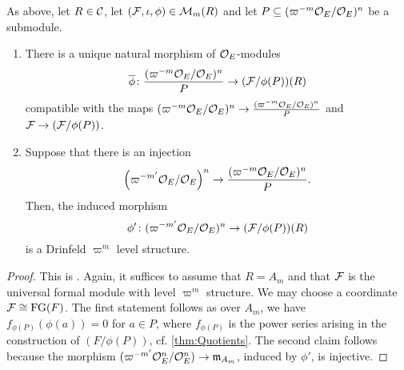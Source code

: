 \documentclass[../main.tex]{subfiles}
\begin{document}
\begin{lem}\label{lem:DrinfeldLevelOnQuotients}
  As above, let $R \in \mathcal{C}$, let $(\mathcal{F}, \iota, \phi) \in \mathcal{M}_m(R)$ and let 
  $P \subseteq (\varpi^{-m}\mathcal{O}_E/\mathcal{O}_E)^n$ be a submodule.   
  \begin{enumerate}
    \item There is a unique natural morphism of $\mathcal{O}_E$-modules
      \begin{equation*}
        \overline \phi \colon \frac{(\varpi^{-m} \mathcal{O}_E/\mathcal{O}_E)^n}{P} \to (\mathcal{F}/\phi(P))(R)
      \end{equation*}
      compatible with the maps $(\varpi^{-m}\mathcal{O}_E/\mathcal{O}_E)^n \to
      \frac{(\varpi^{-m} \mathcal{O}_E/\mathcal{O}_E)^n}{P}$ and $\mathcal{F} \to (\mathcal{F}/\phi(P))$. 
    \item Suppose that  there is an injection 
  \begin{equation*}
    \left(\varpi^{-m'} \mathcal{O}_E/\mathcal{O}_E \right)^n \to \frac{(\varpi^{-m}
    \mathcal{O}_E/\mathcal{O}_E)^n}{P}.
  \end{equation*}
  Then, the induced morphism 
  \begin{equation*}
  \phi'\colon ({\varpi^{-m'} \mathcal{O}_E}/{\mathcal{O}_E})^n  \to 
  (\mathcal{F}/\phi(P))(R)
  \end{equation*}
  is a Drinfeld $\varpi^m$ level structure.
  \end{enumerate}
\end{lem}
\begin{proof}
  This is \cite[Proposition 4.4]{drinfel1974elliptic}. Again, it suffices to assume that $R = A_m$ and that $\mathcal{F}$ is the universal formal module with level
  $\varpi^m$ structure. We may choose a coordinate $\mathcal{F} \cong \textnormal{FG}(F)$. The first
  statement follows as over $A_m$, we have $f_{\phi(P)}(\phi(a)) = 0$ for $a
  \in P$, where $f_{\phi(P)}$ is the power series arising in the construction of 
  $(F/\phi(P))$, cf. \cref{thm:Quotients}. The second claim follows because the morphism $(\varpi^{-m'} \mathcal{O}_E^n/\mathcal{O}_E^n) \to \mathfrak{m}_{A_m}$, induced by $\phi'$, is injective.
\end{proof}
\end{document}
